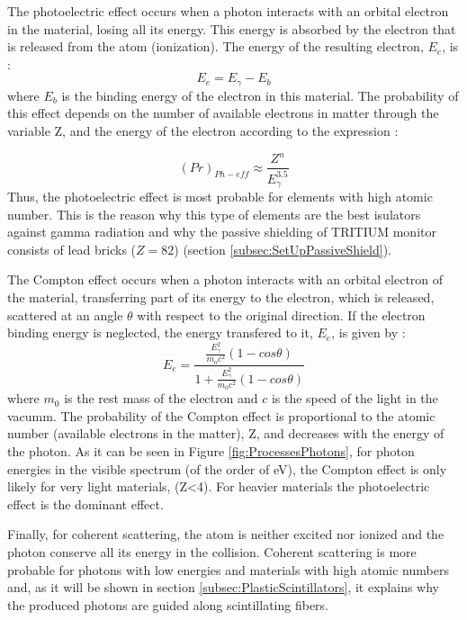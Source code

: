 The photoelectric effect occurs when a photon interacts with an orbital electron in the material, losing all its energy. This energy is absorbed by the electron that is released from the atom (ionization). The energy of the resulting electron, $E_e$, is \cite{Knoll, Leo}:
\begin{equation}
E_e = E_\gamma - E_b 
\label{eq:PhotoelectricEffect}
\end{equation}
where $E_b$ is the binding energy of the electron in this material. The probability of this effect depends on the number of available electrons in matter through the variable Z, and the energy of the electron according to the expression \cite{Knoll}:

\begin{equation}
\left(Pr\right)_{Ph-eff} \approx \frac{Z^n}{E_\gamma^{3.5}}
\label{eq:PhotoelectricProb}
\end{equation}
Thus, the photoelectric effect is most probable for elements with high atomic number. This is the reason why this type of elements are the best isulators against gamma radiation and why the passive shielding of TRITIUM monitor consists of lead bricks ($Z=82$) (section \ref{subsec:SetUpPassiveShield}). %

The Compton effect occurs when a photon interacts with an orbital electron of the material, transferring part of its energy to the electron, which is released, scattered at an angle $\theta$ with respect to the original direction. If the electron binding energy is neglected, the energy transfered to it, $E_e$, is given by \cite{Knoll, Leo}:
\begin{equation}
E_e=\frac{\displaystyle{\frac{E_\gamma^2}{m_oc^2}}\left(1-cos\theta\right)}{1+ \displaystyle{\frac{E_\gamma^2}{m_oc^2}}\left(1-cos\theta\right)}
\label{eq:ComptonEffect}
\end{equation}
where $m_0$ is the rest mass of the electron and $c$ is the speed of the light in the vacumm. The probability of the Compton effect is proportional to the atomic number (available electrons in the matter), Z,  and decreases with the energy of the photon. As it can be seen in Figure \ref{fig:ProcessesPhotons}, for photon energies in the visible spectrum (of the order of eV), the Compton effect is only likely for very light materials, (Z<4). For heavier materials the photoelectric effect is the dominant effect.

Finally, for coherent scattering, the atom is neither excited nor ionized and the photon conserve all its energy in the collision. Coherent scattering is more probable for photons with low energies and materials with high atomic numbers and, as it will be shown in section \ref{subsec:PlasticScintillators}, it explains why the produced photons are guided along scintillating fibers. 


